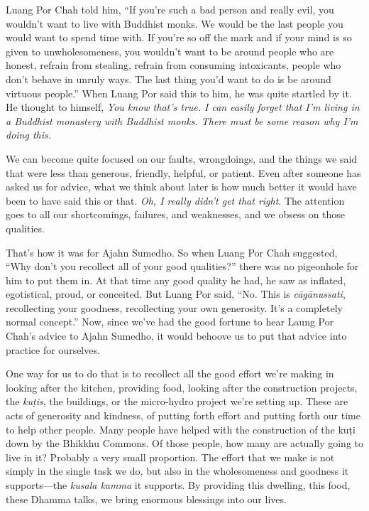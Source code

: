 Luang Por Chah told him, ``If you're such a bad person and really evil, 
you wouldn't want to live with Buddhist monks. We would be the last 
people you would want to spend time with. If you're so off the mark and 
if your mind is so given to unwholesomeness, you wouldn't want to be 
around people who are honest, refrain from stealing, refrain from 
consuming intoxicants, people who don't behave in unruly ways. The last 
thing you'd want to do is be around virtuous people.'' When Luang Por 
said this to him, he was quite startled by it. He thought to himself, 
\emph{You know that's true. I can easily forget that I'm living in a 
Buddhist monastery with Buddhist monks. There must be some reason why 
I'm doing this.}

We can become quite focused on our faults, wrongdoings, and the things 
we said that were less than generous, friendly, helpful, or patient. 
Even after someone has asked us for advice, what we think about later 
is how much better it would have been to have said this or that. 
\emph{Oh, I really didn't get that right}. The attention goes to all 
our shortcomings, failures, and weaknesses, and we obsess on those 
qualities.

That's how it was for Ajahn Sumedho. So when Luang Por Chah suggested, 
``Why don't you recollect all of your good qualities?'' there was no 
pigeonhole for him to put them in. At that time any good quality he 
had, he saw as inflated, egotistical, proud, or conceited. But Luang 
Por said, ``No. This is \emph{cāgānussati}, recollecting your 
goodness, recollecting your own generosity. It's a completely normal 
concept.'' Now, since we've had the good fortune to hear Laung Por 
Chah's advice to Ajahn Sumedho, it would behoove us to put that advice 
into practice for ourselves.

One way for us to do that is to recollect all the good effort we're 
making in looking after the kitchen, providing food, looking after the 
construction projects, the \emph{kuṭis}, the buildings, or the 
micro-hydro project we're setting up. These are acts of generosity and 
kindness, of putting forth effort and putting forth our time to help 
other people. Many people have helped with the construction of the 
kuṭi down by the Bhikkhu Commons. Of those people, how many are 
actually going to live in it? Probably a very small proportion. The 
effort that we make is not simply in the single task we do, but also in 
the wholesomeness and goodness it supports---the \emph{kusala kamma} it 
supports. By providing this dwelling, this food, these Dhamma talks, we 
bring enormous blessings into our lives.

